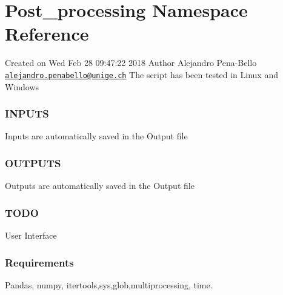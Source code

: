 \hypertarget{namespace_post__processing}{}\section{Post\+\_\+processing Namespace Reference}
\label{namespace_post__processing}


Created on Wed Feb 28 09\+:47\+:22 2018 Author Alejandro Pena-\/\+Bello \href{mailto:alejandro.penabello@unige.ch}{\tt alejandro.\+penabello@unige.\+ch} The script has been tested in Linux and Windows \subsubsection*{I\+N\+P\+U\+TS }

Inputs are automatically saved in the \textquotesingle{}Output\textquotesingle{} file \subsubsection*{O\+U\+T\+P\+U\+TS }

Outputs are automatically saved in the \textquotesingle{}Output\textquotesingle{} file \subsubsection*{T\+O\+DO }

User Interface \subsubsection*{Requirements }

Pandas, numpy, itertools,sys,glob,multiprocessing, time.  


